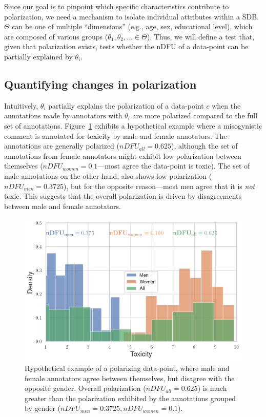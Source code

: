 \documentclass{article}
\begin{document}
Since our goal is to pinpoint which specific characteristics contribute to polarization, we need a mechanism to isolate individual attributes within a \ac{SDB}. $\Theta$ can be one of multiple ``dimensions'' (e.g., age, sex, educational level), which are composed of various groups ($\theta_1, \theta_2, \ldots \in \Theta$). Thus, we will define a test that, given that polarization exists, tests whether the \ac{nDFU} of a data-point can be partially explained by $\theta_i$.


\subsection{Quantifying changes in polarization}
\label{ssec:methodology:intuition}

Intuitively, $\theta_i$ partially explains the polarization of a data-point $c$ when the annotations made by annotators with $\theta_i$ are more polarized compared to the full set of annotations. Figure~\ref{fig:ndfu_single_data-point} exhibits a hypothetical example where a misogynistic comment is annotated for toxicity by male and female annotators. The annotations are generally polarized ($nDFU_{all} = 0.625$), although the set of annotations from female annotators might exhibit low polarization between themselves ($nDFU_{women} = 0.1$---most agree the data-point is toxic). The set of male annotations on the other hand, also shows low polarization ($nDFU_{men} = 0.3725$), but for the opposite reason---most men agree that it is \emph{not} toxic. This suggests that the overall polarization is driven by disagreements between male and female annotators.

\begin{figure}
	\centering
	\includegraphics[width=0.8\linewidth]{ndfu_combined.png}
	\caption{Hypothetical example of a polarizing data-point, where male and female annotators agree between themselves, but disagree with the opposite gender. Overall polarization ($nDFU_{all} = 0.625$) is much greater than the polarization exhibited by the annotations grouped by gender ($nDFU_{men} = 0.3725, nDFU_{women} = 0.1$). %
    }
	\label{fig:ndfu_single_data-point}
\end{figure}
\end{document}
